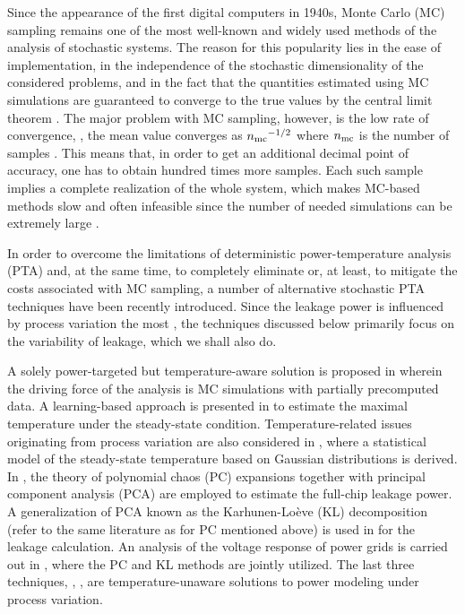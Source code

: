 Since the appearance of the first digital computers in 1940s, Monte Carlo (MC) sampling remains one of the most well-known and widely used methods of the analysis of stochastic systems.
The reason for this popularity lies in the ease of implementation, in the independence of the stochastic dimensionality of the considered problems, and in the fact that the quantities estimated using MC simulations are guaranteed to converge to the true values by the central limit theorem \cite{durrett2010}.
The major problem with MC sampling, however, is the low rate of convergence, \eg, the mean value converges as ${n_\text{mc}}^{-{{1}/{2}}}$ where ${n_\text{mc}}$ is the number of samples \cite{xiu2010, maitre2010}.
This means that, in order to get an additional decimal point of accuracy, one has to obtain hundred times more samples.
Each such sample implies a complete realization of the whole system, which makes MC-based methods slow and often infeasible since the number of needed simulations can be extremely large \cite{diaz-emparanza2002}.

In order to overcome the limitations of deterministic power-temperature analysis (PTA) and, at the same time, to completely eliminate or, at least, to mitigate the costs associated with MC sampling, a number of alternative stochastic PTA techniques have been recently introduced.
Since the leakage power is influenced by process variation the most \cite{chandrakasan2001, srivastava2010, juan2011, juan2012}, the techniques discussed below primarily focus on the variability of leakage, which we shall also do.

A solely power-targeted but temperature-aware solution is proposed in \cite{chandra2010} wherein the driving force of the analysis is MC simulations with partially precomputed data.
A learning-based approach is presented in \cite{juan2011} to estimate the maximal temperature under the steady-state condition.
Temperature-related issues originating from process variation are also considered in \cite{juan2012}, where a statistical model of the steady-state temperature based on Gaussian distributions is derived.
In \cite{shen2009}, the theory of polynomial chaos (PC) expansions \cite{xiu2010, maitre2010, ghanem1991, eldred2009} together with principal component analysis (PCA) are employed to estimate the full-chip leakage power.
A generalization of PCA known as the Karhunen-Lo\`{e}ve (KL) decomposition (refer to the same literature as for PC mentioned above) is used in \cite{bhardwaj2006} for the leakage calculation.
An analysis of the voltage response of power grids is carried out in \cite{ghanta2006}, where the PC and KL methods are jointly utilized. The last three techniques, \ie, \cite{shen2009, bhardwaj2006, ghanta2006}, are temperature-unaware solutions to power modeling under process variation.

